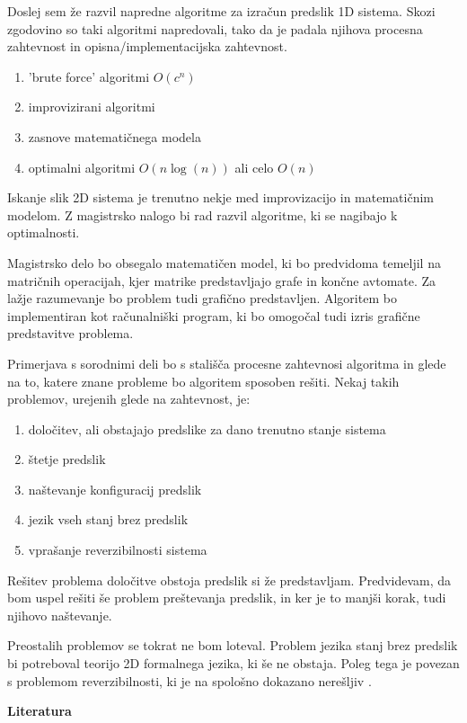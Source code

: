 \documentclass[a4paper, 12pt]{article}
\begin{document}
\bigskip

Doslej sem že razvil napredne algoritme za izračun predslik 1D sistema.
Skozi zgodovino so taki algoritmi napredovali, tako da je padala njihova
procesna zahtevnost in opisna/implementacijska zahtevnost.
\begin{enumerate}
\item 'brute force' algoritmi \( O(c^n) \)
\item improvizirani algoritmi
\item zasnove matematičnega modela
\item optimalni algoritmi \( O(n \log(n)) \) ali celo \( O(n) \)
\end{enumerate}
Iskanje slik 2D sistema je trenutno nekje med improvizacijo in matematičnim modelom.
Z magistrsko nalogo bi rad razvil algoritme, ki se nagibajo k optimalnosti.

Magistrsko delo bo obsegalo matematičen model, ki bo predvidoma temeljil na matričnih operacijah,
kjer matrike predstavljajo grafe in končne avtomate.
Za lažje razumevanje bo problem tudi grafično predstavljen.
Algoritem bo implementiran kot računalniški program,
ki bo omogočal tudi izris grafične predstavitve problema.

Primerjava s sorodnimi deli bo s stališča procesne zahtevnosi algoritma in glede na to,
katere znane probleme bo algoritem sposoben rešiti. Nekaj takih problemov, urejenih glede na zahtevnost, je:
\begin{enumerate}
\item določitev, ali obstajajo predslike za dano trenutno stanje sistema
\item štetje predslik
\item naštevanje konfiguracij predslik
\item jezik vseh stanj brez predslik
\item vprašanje reverzibilnosti sistema
\end{enumerate}

Rešitev problema določitve obstoja predslik si že predstavljam. 
Predvidevam, da bom uspel rešiti še problem preštevanja predslik,
in ker je to manjši korak, tudi njihovo naštevanje.

Preostalih problemov se tokrat ne bom loteval.
Problem jezika stanj brez predslik bi potreboval teorijo 2D formalnega jezika, ki še ne obstaja.
Poleg tega je povezan s problemom reverzibilnosti, ki je na spološno dokazano nerešljiv \cite{Kari1989}.

\bigskip
{\bf Literatura}
\label{literatura}

\renewcommand\refname{}
\vspace{-50px}


\end{document}
